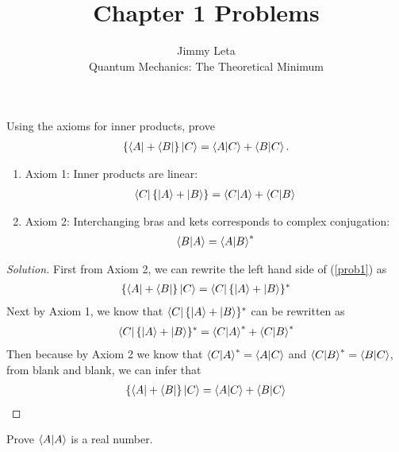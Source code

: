 \documentclass[10pt]{article}
\newenvironment{problem}[2][Problem]{\begin{trivlist}
\item[\hskip \labelsep {\bfseries #1}\hskip \labelsep {\bfseries #2.}]}{\end{trivlist}}
\begin{document}
\title{Chapter 1 Problems}
\author{Jimmy Leta\\
  Quantum Mechanics: The Theoretical Minimum}
\maketitle

\begin{problem}{1.1a}
Using the axioms for inner products, prove
\begin{align}
  \{\bra{A} + \bra{B}\}\ket{C}=\bra{A}\ket{C} + \bra{B}\ket{C}.\label{prob1}
\end{align}
\begin{enumerate}
  \item[] Axiom 1: Inner products are linear:
  \begin{align*}
    \bra{C}\{\ket{A} + \ket{B} \} = \bra{C}\ket{A} + \bra{C}\ket{B}
  \end{align*} 
  \item[] Axiom 2: Interchanging bras and kets corresponds to complex conjugation:
  \begin{align*}
    \bra{B}\ket{A} = \bra{A}\ket{B}^*
   \end{align*} 
\end{enumerate}
\end{problem}

\begin{proof}[Solution]
  First from Axiom 2, we can rewrite the left hand side of (\ref{prob1}) as
  \begin{align*}
    \{\bra{A} + \bra{B}\}\ket{C} = \bra{C}\{\ket{A} + \ket{B}\}^*
  \end{align*}
  Next by Axiom 1, we know that $\bra{C}\{\ket{A} + \ket{B}\}^*$ can be rewritten as
  \begin{align*}
    \bra{C}\{\ket{A} + \ket{B}\}^* = \bra{C}\ket{A}^* + \bra{C}\ket{B}^*
  \end{align*}
  Then because by Axiom 2 we know that $\bra{C}\ket{A}^*=\bra{A}\ket{C}$ and 
  $\bra{C}\ket{B}^*=\bra{B}\ket{C}$, from blank and blank, we can infer that
  \begin{align*}
    \{\bra{A} + \bra{B}\}\ket{C}=\bra{A}\ket{C} + \bra{B}\ket{C}
  \end{align*}
\end{proof}

%

\begin{problem}{1.1b}
Prove $\bra{A}\ket{A}$ is a real number.
\end{problem}
\end{document}
